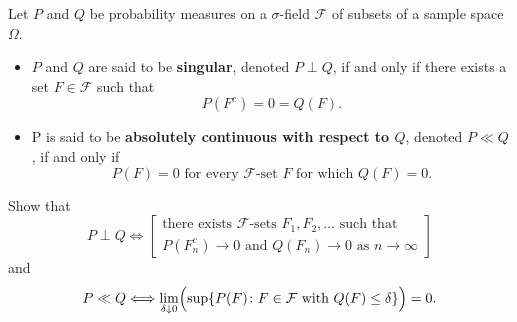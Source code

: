 \begin{exercise}
Let $P$ and $Q$ be probability measures on a $\sigma$-field $\mathcal F$ of subsets of a sample space $\Omega$.
\begin{itemize}
\item
$P$ and $Q$ are said to be {\bf singular}, denoted $P\perp Q$, if and only if there exists a set $F\in\mathcal F$ such that
\[P(F^c)=0=Q(F).\]
\item
P is said to be {\bf absolutely continuous with respect to $Q$}, denoted $P \ll Q$, if and only if
\[\text{$P(F)=0$ for every $\mathcal F$-set $F$ for which $Q(F)=0$.}  \]
\end{itemize}
Show that
\[P\perp Q \Longleftrightarrow \left[\begin{array}{c}
\text{there exists $\mathcal F$-sets $F_1, F_2,\ldots$ such that}\\
\text{$P(F_n^c)\rightarrow 0$ and $Q(F_n)\rightarrow 0$ as $n\rightarrow \infty$}
\end{array} \right] \]
and
\[P\ll Q \Longleftrightarrow  \lim_{\delta\downarrow 0}\Bigl( \sup\{ P(F)\colon \text{$F\in \mathcal F$ with $Q(F)\leq \delta$} \}\Bigr)=0. \]
\end{exercise}
